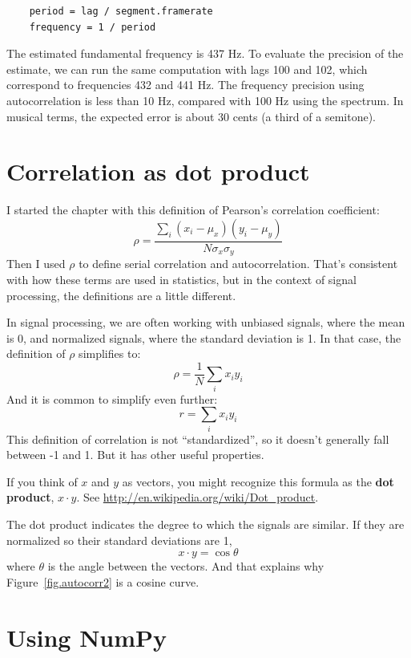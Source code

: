 \documentclass[12pt]{book}
\begin{document}
\begin{verbatim}
    period = lag / segment.framerate
    frequency = 1 / period
\end{verbatim}

The estimated fundamental frequency is 437 Hz.  To evaluate the
precision of the estimate, we can run the same computation with
lags 100 and 102, which correspond to frequencies 432 and 441 Hz.
The frequency precision using autocorrelation is less than 10 Hz,
compared with 100 Hz using the spectrum.  In musical terms, the
expected error is about 30 cents (a third of a semitone).


\section{Correlation as dot product}
\label{dotproduct}

I started the chapter with this definition of Pearson's
correlation coefficient:
%
\[ \rho = \frac{ \sum_i (x_i - \mu_x) (y_i - \mu_y)}{N \sigma_x \sigma_y} \]
%
Then I used $\rho$ to define serial correlation and autocorrelation.
That's consistent with how these terms are used in statistics,
but in the context of signal processing, the definitions are
a little different.

In signal processing, we are often working with unbiased signals,
where the mean is 0, and normalized signals, where the standard
deviation is 1.  In that case, the definition of $\rho$ simplifies to:
%
\[ \rho = \frac{1}{N} \sum_i x_i y_i \]
%
And it is common to simplify even further:
%
\[ r = \sum_i x_i y_i \]
%
This definition of correlation is not ``standardized'', so it doesn't
generally fall between -1 and 1.  But it has other useful properties.

If you think of $x$ and $y$ as vectors, you might recognize this
formula as the {\bf dot product}, $x \cdot y$.  See
\url{http://en.wikipedia.org/wiki/Dot_product}.

\newcommand{\norm}{\mathrm{norm}}

The dot product indicates the degree to which the signals are similar.
If they are normalized so their standard deviations are 1,
%
\[ x \cdot y = \cos \theta \]
%
where $\theta$ is the angle between the vectors.  And that explains
why Figure~\ref{fig.autocorr2} is a cosine curve.


\section{Using NumPy}
\label{correlate}
\end{document}
